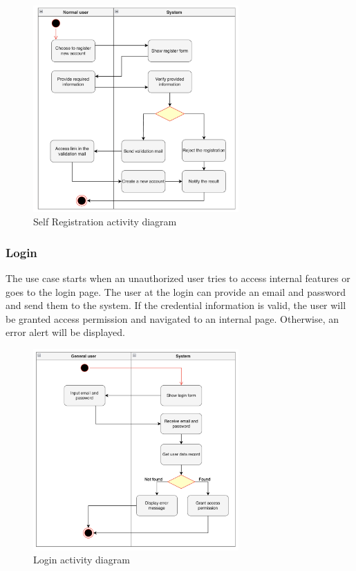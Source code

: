 \begin{figure}[H]
  \centering
  \includegraphics[width=0.7\textwidth]{Figures/self_register.png}
  \caption{Self Registration activity diagram}
  \label{fig:self-registration}
\end{figure}


\subsubsection{Login}

The use case starts when an unauthorized user tries to access internal features or goes to the login page. The user at the login can provide an email and password and send them to the system. If the credential information is valid, the user will be granted access permission and navigated to an internal page. Otherwise, an error alert will be displayed.

\begin{figure}[H]
  \centering
  \includegraphics[width=0.7\textwidth]{Figures/login.png}
  \caption{Login activity diagram}
  \label{fig:login}
\end{figure}

